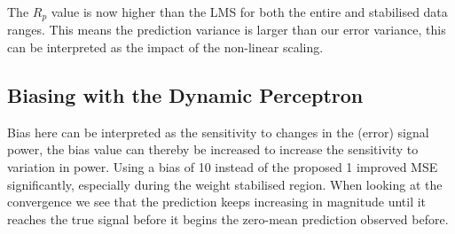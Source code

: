 \documentclass[12pt]{article}
\numberwithin{equation}{section}
\begin{document}
		The $R_p$ value is now higher than the LMS for both the entire and stabilised data ranges. This means the prediction variance is larger than our error variance, this can be interpreted as the impact of the non-linear scaling.
		
	\subsection{Biasing with the Dynamic Perceptron} \label{sec: 4-4-biasing-dynamic-perceptron}
		\begin{minipage}[b]{0.49\textwidth}
			Bias here can be interpreted as the sensitivity to changes in the (error) signal power, the bias value can thereby be increased to increase the sensitivity to variation in power. Using a bias of 10 instead of the proposed 1 improved MSE significantly, especially during the weight stabilised region. When looking at the convergence we see that the prediction keeps increasing in magnitude until it reaches the true signal before it begins the zero-mean prediction observed before.
		\end{minipage}%
		\begin{minipage}{0.04\textwidth}
			\hspace*{0.04\textwidth}
		\end{minipage}%
\end{document}
